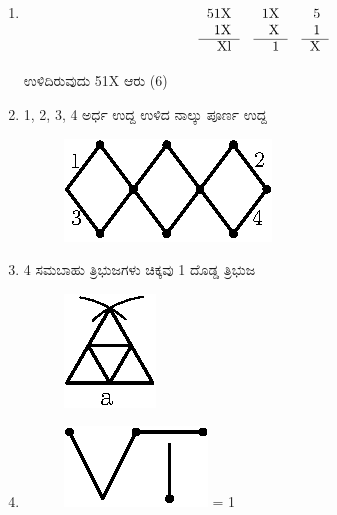 \begin{enumerate}
\item 
\begin{equation*}
\begin{tabular}[t]{r}
51X \\
1X\\\cline{1-1} 
Xl
\end{tabular}
\quad
\begin{tabular}[t]{r}
1X\\ 
X\\\cline{1-1} 
1
\end{tabular}
\quad
\begin{tabular}[t]{r}
5\\
1\\\cline{1-1}
X
\end{tabular}
\end{equation*}

ಉಳಿದಿರುವುದು 51X ಆರು (6)

\item 1, 2, 3, 4 ಅರ್ಧ ಉದ್ದ ಉಳಿದ ನಾಲ್ಕು ಪೂರ್ಣ ಉದ್ದ

\begin{figure}[H]
\centering
\includegraphics{images/chap4/ans13.eps}
\end{figure}

\item 4 ಸಮಬಾಹು ತ್ರಿಭುಜಗಳು ಚಿಕ್ಕವು 1 ದೊಡ್ಡ ತ್ರಿಭುಜ

\begin{figure}[H]
\centering
\includegraphics{images/chap4/ans14.eps}
\end{figure}

\item
\begin{figure}[H]
\centering
\includegraphics{images/chap4/ans15.eps}
 = 1
 \end{figure}


\end{enumerate}
